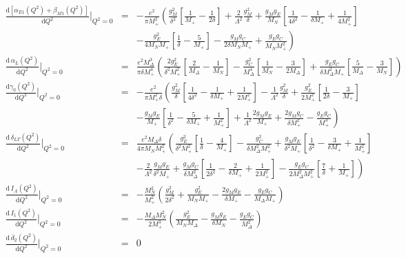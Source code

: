 \documentclass[twocolumn,prc,showpacs,nofootinbib,preprintnumbers,amsmath,amssymb,superscriptaddress]{revtex4-1}
\def\bea{\begin{eqnarray}}
\def\eea{\end{eqnarray}}
\def\eqlab#1{\label{eq:#1}}
\def\al{\alpha}
\def\nn{\nonumber}
\def\dd{\mathrm{d}}
\begin{document}
\begin{widetext}
\bea
\frac{\dd \left[\alpha_{E1}(Q^2)+\beta_{M1}(Q^2)\right]}{\dd Q^2}\Bigg\vert_{Q^2=0}&=&-\frac{e^2}{\pi M_+^2}\left(\frac{g_M^2}{\delta^2}\left[\frac{1}{M_+}-\frac{1}{2\delta}\right]+\frac{2}{ \Lambda^2 }\frac{g_M^2}{\delta}\right.+\frac{g_M g_E}{M_N}\left[\frac{1}{4\delta^2}-\frac{1}{\delta M_+}+\frac{1}{4M_+^2}\right]\nn\\
&&\left.-\frac{g_E^2}{4M_NM_+}\left[\frac{1}{\delta}-\frac{5}{M_+}\right]-\frac{ g_M g_C}{2  \delta  M_NM_+}+\frac{g_E g_C}{M_NM_+^2}\right)\qquad\\
\frac{\dd\, \al_L(Q^2)}{\dd Q^2}\Bigg\vert_{Q^2=0}&=&\frac{e^2 M_\Delta^3}{\pi \delta M_+^4}\left(\frac{2g_E^2}{\delta^2 M_+^2}\left[\frac{2}{M_\Delta}-\frac{1}{M_N}\right]-\frac{g_C^2}{ M_\Delta^4}\left[\frac{1}{M_N}-\frac{3}{2M_\Delta}\right]+\frac{g_E g_C}{\delta M_\Delta^2 M_+}\left[\frac{5}{M_\Delta}-\frac{3}{M_N}\right]\right)\qquad\\
\frac{\dd \gamma_0(Q^2)}{\dd Q^2}\Bigg\vert_{Q^2=0}&=&-\frac{e^2}{\pi M_+^2 \delta}\left(\frac{g_M^2}{\delta}\left[\frac{1}{4\delta^2}-\frac{1}{\delta M_+}+\frac{1}{2 M_+^2}\right]-\frac{1}{\Lambda^2}\frac{g_M^2}{ \delta}+\frac{g_E^2}{2 M_+^2}\left[\frac{1}{2\delta}-\frac{3}{M_+}\right]\right.\nn\\
&& \left.-\frac{g_M g_E}{M_+}\left[\frac{1}{\delta^2}-\frac{5}{\delta M_+}+\frac{1}{M_+^2}\right]+\frac{1}{\Lambda^2}\frac{2g_M g_E}{ M_+}+\frac{2 g_M g_C}{\delta M_+^2}-\frac{g_E g_C}{M_+^3}\right)\\
\frac{\dd\, \delta_{LT}(Q^2)}{\dd Q^2}\Bigg\vert_{Q^2=0}&=&\frac{e^2  M_\Delta \delta}{4
\pi M_NM_+^2}\left(\frac{g_E^2 }{\delta^2 M_+^2}\left[\frac{1}{\delta}-\frac{4}{M_+}\right]-\frac{g_C^2}{\delta M_\Delta^2 M_+^2}+\frac{g_M g_E }{\delta^2 M_+}\left[\frac{1}{\delta^2}-\frac{3}{\delta M_+}+\frac{1}{M_+^2}\right]\right.\nn\\
&&\left.-\frac{2}{ \Lambda^2}\frac{g_M g_E }{\delta^2M_+}+\frac{g_M g_C}{\delta M_\Delta^2 }\left[\frac{1}{2\delta^2}-\frac{2}{\delta M_+}+\frac{1}{2 M_+^2}\right]-\frac{g_E g_C}{2M_\Delta^2 M_+^2}\left[\frac{7}{\delta}+\frac{1}{M_+}\right]\right)\\
\frac{\dd\, I_A(Q^2)}{\dd Q^2}\Bigg\vert_{Q^2=0}&=&-\frac{M_N^2}{M_+^2}\left(\frac{g_M^2}{2 \delta ^2}+\frac{g_E^2}{M_NM_+}-\frac{2 g_M g_E}{\delta  M_+}-\frac{g_E g_C}{M_\Delta M_+}\right)\\
\frac{\dd\, I_1(Q^2)}{\dd Q^2}\Bigg\vert_{Q^2=0}&=&-\frac{M_\Delta M_N^2}{2M_+^3}\left(\frac{g_E^2}{M_N M_\Delta}-\frac{g_M g_E}{ \delta  M_N}
-\frac{g_E g_C}{M_\Delta^2 }\right)\\
\eqlab{d2momQ2}
\frac{\dd\, \bar d_2(Q^2)}{\dd Q^2}\Bigg\vert_{Q^2=0}&=&0
\eea




\end{widetext}
\end{document}
